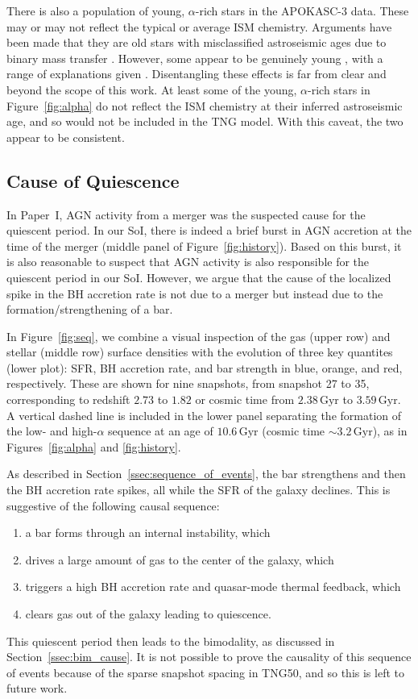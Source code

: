 \documentclass[twocolumn]{aastex631}
\newcommand{\Gyr}{\ensuremath{\textrm{Gyr}}}
\begin{document}
There is also a population of young, $\alpha$-rich stars in the APOKASC-3 data. These may or may not reflect the typical or average ISM chemistry. Arguments have been made that they are old stars with misclassified astroseismic ages due to binary mass transfer \citep[and references therein]{2023A&A...671A..21J}. However, some appear to be genuinely young \citep[and references therein]{2024arXiv241002962L}, with a range of explanations given \citep[e.g.][]{2015A&A...576L..12C,2021MNRAS.508.4484J,2023arXiv231105815S}. Disentangling these effects is far from clear and beyond the scope of this work. At least some of the young, $\alpha$-rich stars in Figure~\ref{fig:alpha} do not reflect the ISM chemistry at their inferred astroseismic age, and so would not be included in the TNG model. With this caveat, the two appear to be consistent.

\subsection{Cause of Quiescence}\label{ssec:cause_qui}
In Paper~I, AGN activity from a merger was the suspected cause for the quiescent period. In our SoI, there is indeed a brief burst in AGN accretion at the time of the merger (middle panel of Figure~\ref{fig:history}). Based on this burst, it is also reasonable to suspect that AGN activity is also responsible for the quiescent period in our SoI. However, we argue that the cause of the localized spike in the BH accretion rate is not due to a merger but instead due to the formation/strengthening of a bar.

In Figure~\ref{fig:seq}, we combine a visual inspection of the gas (upper row) and stellar (middle row) surface densities with the evolution of three key quantites (lower plot): SFR, BH accretion rate, and bar strength in blue, orange, and red, respectively. These are shown for nine snapshots, from snapshot 27 to 35, corresponding to redshift $2.73$ to $1.82$ or cosmic time from $2.38\,\Gyr$ to $3.59\,\Gyr$. A vertical dashed line is included in the lower panel separating the formation of the low- and high-$\alpha$ sequence at an age of $10.6\,\Gyr$ (cosmic time $\sim3.2\,\Gyr$), as in Figures~\ref{fig:alpha} and \ref{fig:history}.

As described in Section~\ref{ssec:sequence_of_events}, the bar strengthens and then the BH accretion rate spikes, all while the SFR of the galaxy declines. This is suggestive of the following causal sequence:
\begin{enumerate}
  \item a bar forms through an internal instability, which
  \item drives a large amount of gas to the center of the galaxy, which
  \item triggers a high BH accretion rate and quasar-mode thermal feedback, which
  \item clears gas out of the galaxy leading to quiescence.
\end{enumerate}
This quiescent period then leads to the bimodality, as discussed in Section~\ref{ssec:bim_cause}. It is not possible to prove the causality of this sequence of events because of the sparse snapshot spacing in TNG50, and so this is left to future work.
\end{document}
